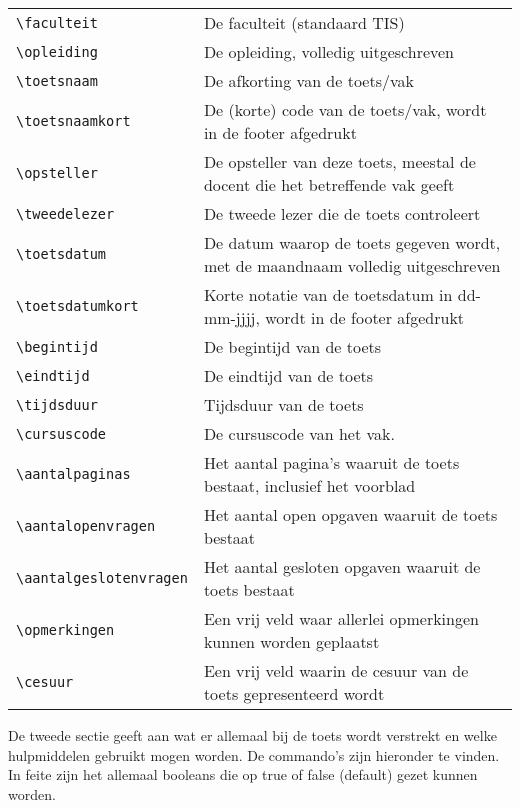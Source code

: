 \documentclass[12pt,dutch,addpoints,fleqn]{tisdexam}
\begin{document}
\begin{tabular}{lp{11.9cm}}
\verb|\faculteit| & De faculteit (standaard TIS)\\
\verb|\opleiding| & De opleiding, volledig uitgeschreven\\ 
\verb|\toetsnaam| & De afkorting van de toets/vak \\
\verb|\toetsnaamkort| & De (korte) code van de toets/vak, wordt in de footer afgedrukt \\ 
\verb|\opsteller| & De opsteller van deze toets, meestal de docent die het betreffende vak geeft \\
\verb|\tweedelezer| & De tweede lezer die de toets controleert \\
\verb|\toetsdatum| & De datum waarop de toets gegeven wordt, met de maandnaam volledig uitgeschreven \\ 
\verb|\toetsdatumkort| & Korte notatie van de toetsdatum in dd-mm-jjjj, wordt in de footer afgedrukt \\
\verb|\begintijd|       & De begintijd van de toets \\
\verb|\eindtijd|     & De eindtijd van de toets \\ 
\verb|\tijdsduur| & Tijdsduur van de toets \\
\verb|\cursuscode|    & De cursuscode van het vak. \\
\verb|\aantalpaginas| & Het aantal pagina's waaruit de toets bestaat, inclusief het voorblad \\
\verb|\aantalopenvragen| & Het aantal open opgaven waaruit de toets bestaat \\
\verb|\aantalgeslotenvragen| & Het aantal gesloten opgaven waaruit de toets bestaat \\
\verb|\opmerkingen| & Een vrij veld waar allerlei opmerkingen kunnen worden geplaatst \\
\verb|\cesuur| & Een vrij veld waarin de cesuur van de toets gepresenteerd wordt \\
\end{tabular}

De tweede sectie geeft aan wat er allemaal bij de toets wordt verstrekt en welke hulpmiddelen gebruikt
mogen worden. De commando's zijn hieronder te vinden. In feite zijn het allemaal booleans die op true
of false (default) gezet kunnen worden.
\end{document}
